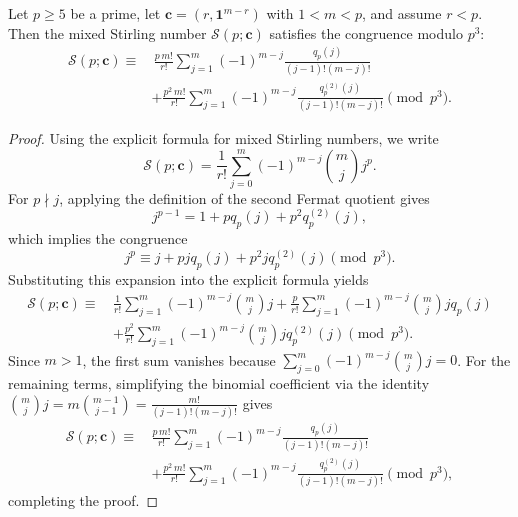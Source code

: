 \documentclass[10pt,a4paper]{amsart}
\begin{document}
\begin{theorem}
\label{thm:p3_mixed_stirling}
Let $p \ge 5$ be a prime, let $\mathbf{c} = (r, \mathbf{1}^{m-r})$ with $1 < m < p$, and assume $r < p$. Then the mixed Stirling number $\mathcal{S}(p; \mathbf{c})$ satisfies the congruence modulo $p^3$:
\begin{align}
\mathcal{S}(p; \mathbf{c})
\equiv&\,
\frac{p \, m!}{r!}
\sum_{j=1}^{m}
(-1)^{m-j}
\frac{q_p(j)}{(j-1)!(m-j)!}
\nonumber\\
&+
\frac{p^2 \, m!}{r!}
\sum_{j=1}^{m}
(-1)^{m-j}
\frac{q_p^{(2)}(j)}{(j-1)!(m-j)!}
\pmod{p^3}.
\end{align}
\end{theorem}

\begin{proof}
Using the explicit formula for mixed Stirling numbers, we write
\[
\mathcal{S}(p; \mathbf{c})
=
\frac{1}{r!}
\sum_{j=0}^{m}
(-1)^{m-j} \binom{m}{j} j^p.
\]
For $p \nmid j$, applying the definition of the second Fermat quotient gives
\[
j^{p-1} = 1 + p q_p(j) + p^2 q_p^{(2)}(j),
\]
which implies the congruence
\[
j^p \equiv j + p j q_p(j) + p^2 j q_p^{(2)}(j) \pmod{p^3}.
\]
Substituting this expansion into the explicit formula yields
\begin{align}
\mathcal{S}(p; \mathbf{c})
\equiv\,&
\frac{1}{r!} \sum_{j=1}^{m} (-1)^{m-j} \binom{m}{j} j
+
\frac{p}{r!} \sum_{j=1}^{m} (-1)^{m-j} \binom{m}{j} j q_p(j)
\nonumber\\
&+
\frac{p^2}{r!} \sum_{j=1}^{m} (-1)^{m-j} \binom{m}{j} j q_p^{(2)}(j)
\pmod{p^3}.
\end{align}
Since $m > 1$, the first sum vanishes because $\sum_{j=0}^{m} (-1)^{m-j} \binom{m}{j} j = 0$. For the remaining terms, simplifying the binomial coefficient via the identity $\binom{m}{j} j = m \binom{m-1}{j-1} = \frac{m!}{(j-1)!(m-j)!}$ gives
\begin{align}
\mathcal{S}(p; \mathbf{c})
\equiv\,&
\frac{p \, m!}{r!}
\sum_{j=1}^{m}
(-1)^{m-j}
\frac{q_p(j)}{(j-1)!(m-j)!}
\nonumber\\
&+
\frac{p^2 \, m!}{r!}
\sum_{j=1}^{m}
(-1)^{m-j}
\frac{q_p^{(2)}(j)}{(j-1)!(m-j)!}
\pmod{p^3},
\end{align}
completing the proof.
\end{proof}
\end{document}
